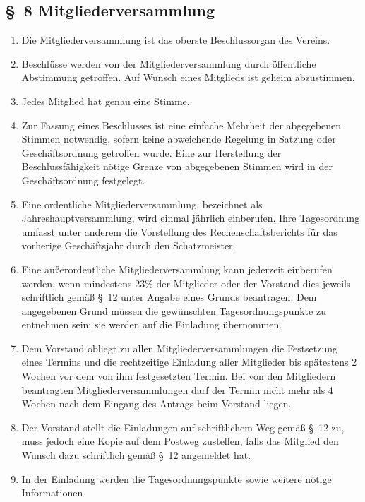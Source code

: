 \documentclass[10pt,a4paper]{scrartcl}
\begin{document}
\subsection*{\S \ 8 Mitgliederversammlung}
\begin{enumerate}

        \item Die Mitgliederversammlung ist das oberste Beschlussorgan des Vereins.
	\item Beschl{\"u}sse werden von der Mitgliederversammlung durch {\"o}ffentliche Abstimmung getroffen.
		Auf Wunsch eines Mitglieds ist geheim abzustimmen.
	\item Jedes Mitglied hat genau eine Stimme.
	\item Zur Fassung eines Beschlusses ist eine einfache Mehrheit der abgegebenen Stimmen
             not\-wen\-dig, sofern keine abweichende Regelung in Satzung oder Gesch{\"a}ftsordnung getroffen wurde.
			 Eine zur Herstellung der Beschlussf{\"a}higkeit n{\"o}tige Grenze von abgegebenen Stimmen wird in der
			 Gesch{\"a}ftsordnung festgelegt.
	\item Eine ordentliche Mitgliederversammlung, bezeichnet als Jahreshauptversammlung,
		wird einmal j{\"a}hrlich einberufen. Ihre Tagesordnung umfasst unter anderem die
		Vorstellung des Rechenschaftsberichts f{\"u}r das vorherige Gesch{\"a}ftsjahr durch
		den Schatzmeister.
	\item Eine au{\ss}erordentliche Mitgliederversammlung kann jederzeit einberufen werden, wenn
		mindestens 23\% der Mitglieder oder der Vorstand dies jeweils schriftlich gem{\"a}{\ss} \S \ 12
		unter Angabe eines Grunds beantragen. Dem angegebenen Grund m{\"u}ssen die gew{\"u}nschten
		Tagesordnungspunkte zu entnehmen sein; sie werden auf die Einladung {\"u}bernommen.
	\item Dem Vorstand obliegt zu allen Mitgliederversammlungen die Festsetzung eines Termins
		und die rechtzeitige Einladung aller Mitglieder bis sp{\"a}testens 2 Wochen vor dem
		von ihm festgesetzten Termin. Bei von den Mitgliedern beantragten
                Mitgliederversammlungen darf der Termin nicht mehr als 4 Wochen nach dem Eingang
		des Antrags beim Vorstand liegen.
	\item Der Vorstand stellt die Einladungen auf schriftlichem Weg gem{\"a}{\ss} \S \ 12 zu, muss
		jedoch eine Kopie auf dem Postweg zustellen, falls das Mitglied den Wunsch dazu
		schriftlich gem{\"a}{\ss} \S \ 12 angemeldet hat.
	\item In der Einladung werden die Tagesordnungspunkte sowie weitere n{\"o}tige Informationen

\end{enumerate}
\end{document}
